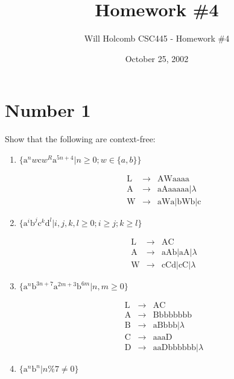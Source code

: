 \documentclass[12pt,a4paper,twoside]{article}  %
\author{Will Holcomb \small{CSC445 - Homework \#4}}
\title{Homework \#4}
\date{October 25, 2002}
\begin{document}
\maketitle

\section{Number 1}

Show that the following are context-free:

\begin{enumerate}

\item $\{\textrm{a}^nw\textrm{c}w^R\textrm{a}^{5n+4} |
  n \geq 0; w \in \{a,b\}\}$

\begin{eqnarray}
\textrm{L}        &\rightarrow& \textrm{AWaaaa} \\
\textrm{A}        &\rightarrow& \textrm{aAaaaaa} | \lambda \\
\textrm{W}        &\rightarrow& \textrm{aWa} | \textrm{bWb} | \textrm{c}
\end{eqnarray}

\item $\{\textrm{a}^i\textrm{b}^j\textrm{c}^k\textrm{d}^l |
  i, j, k, l \geq 0; i \geq j; k \geq l\}$

\begin{eqnarray}
\textrm{L}        &\rightarrow& \textrm{AC} \\
\textrm{A}        &\rightarrow& \textrm{aAb} | \textrm{aA} | \lambda \\
\textrm{W}        &\rightarrow& \textrm{cCd} | \textrm{cC} | \lambda
\end{eqnarray}

\item $\{\textrm{a}^n\textrm{b}^{3n+7}\textrm{a}^{2m+3}\textrm{b}^{6m}
  | n, m \geq 0\}$

\begin{eqnarray}
\textrm{L}        &\rightarrow& \textrm{AC} \\
\textrm{A}        &\rightarrow& \textrm{Bbbbbbbb} \\
\textrm{B}        &\rightarrow& \textrm{aBbbb} | \lambda \\
\textrm{C}        &\rightarrow& \textrm{aaaD} \\
\textrm{D}        &\rightarrow& \textrm{aaDbbbbbb} | \lambda
\end{eqnarray}

\item $\{\textrm{a}^n\textrm{b}^n | n \% 7 \not = 0\}$


\end{enumerate}
\end{document}
